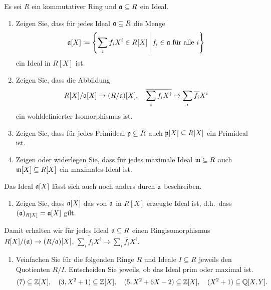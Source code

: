 \begin{question}[subtitle = Koeffizientenideale in Polynomringen]
  \label{question: quotients by ideals coming from the ground ring}
  Es sei $R$ ein kommutativer Ring und $\mathfrak{a} \subseteq R$ ein Ideal.
  \begin{enumerate}
    \item
      Zeigen Sie, dass für jedes Ideal $\mathfrak{a} \subseteq R$ die Menge
      \[
                  \mathfrak{a}[X]
        \coloneqq \left\{
                    \sum_i f_i X^i \in R[X]
                  \,\middle|\,
                    \text{$f_i \in \mathfrak{a}$ für alle $i$}
                  \right\}
      \]
      ein Ideal in $R[X]$ ist.
    \item
      Zeigen Sie, dass die Abbildung
      \[
        R[X]/\mathfrak{a}[X] \to (R/\mathfrak{a})[X],
        \quad
        \overline{\sum_i f_i X^i} \mapsto \sum_i \overline{f_i} X^i
      \]
      ein wohldefinierter Isomorphismus ist.
    \item
      Zeigen Sie, dass für jedes Primideal $\mathfrak{p} \subseteq R$ auch $\mathfrak{p}[X] \subseteq R[X]$ ein Primideal ist.
    \item
      Zeigen oder widerlegen Sie, dass für jedes maximale Ideal $\mathfrak{m} \subseteq R$ auch $\mathfrak{m}[X] \subseteq R[X]$ ein maximales Ideal ist.
  \end{enumerate}
  Das Ideal $\mathfrak{a}[X]$ lässt sich auch noch anders durch $\mathfrak{a}$ beschreiben.
  \begin{enumerate}[resume]
    \item
      Zeigen Sie, dass $\mathfrak{a}[X]$ das von $\mathfrak{a}$ in $R[X]$ erzeugte Ideal ist, d.h.\ dass $(\mathfrak{a})_{R[X]} = \mathfrak{a}[X]$ gilt.
  \end{enumerate}
  Damit erhalten wir für jedes Ideal $\mathfrak{a} \subseteq R$ einen Ringisomorphismus $R[X]/(\mathfrak{a}) \to (R/\mathfrak{a})[X]$, $\overline{\sum_i f_i X^i} \mapsto \sum_i \overline{f_i} X^i$.
  \begin{enumerate}[resume]
    \item
      Veinfachen Sie für die folgenden Ringe $R$ und Ideale $I \subseteq R$ jeweils den Quotienten $R/I$.
      Entscheiden Sie jeweils, ob das Ideal prim oder maximal ist.
      \[
        (7)               \subseteq \mathbb{Z}[X],
        \quad
        (3, X^2 + 1)      \subseteq \mathbb{Z}[X],
        \quad
        (5, X^2 + 6X - 2)  \subseteq \mathbb{Z}[X],
        \quad
        (X^2 + 1)         \subseteq \mathbb{Q}[X,Y].
      \]
  \end{enumerate}
\end{question}


